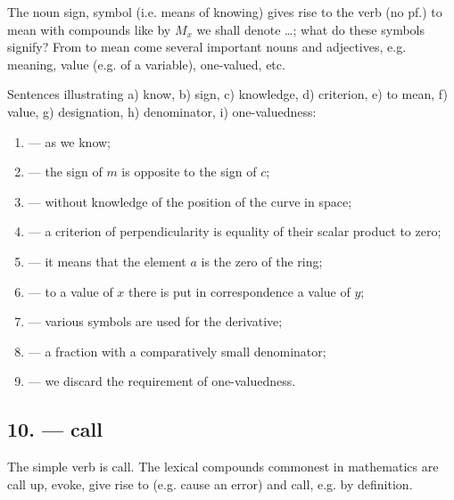 The noun  sign, symbol (i.e. means of knowing) gives rise to the verb  (no pf.) to mean with compounds like  by $M_x$ we shall denote \ldots;  what do these symbols signify? From  to mean come several important nouns and adjectives, e.g.  meaning, value (e.g. of a variable),  one-valued, etc.

Sentences illustrating a)  know, b)  sign, c)  knowledge, d)  criterion, e)  to mean, f)  value, g)  designation, h)  denominator, i)  one-valuedness:

\begin{enumerate}[label=\alph*)]
\item {} --- as we know;
\item {} --- the sign of $m$ is opposite to the sign of $c$;
\item {} --- without knowledge of the position of the curve in space;
\item {} --- a criterion of perpendicularity is equality of their scalar product to zero;
\item {} --- it means that the element $a$ is the zero of the ring;
\item {} --- to a value of $x$ there is put in correspondence a value of $y$;
\item {} --- various symbols are used for the derivative;
\item {} --- a fraction with a comparatively small denominator;
\item {} --- we discard the requirement of one-valuedness.
\end{enumerate}

\subsection*{10.  --- call}

The simple verb is  call. The lexical compounds commonest in mathematics are  call up, evoke, give rise to (e.g.  cause an error) and  call, e.g. by definition.


